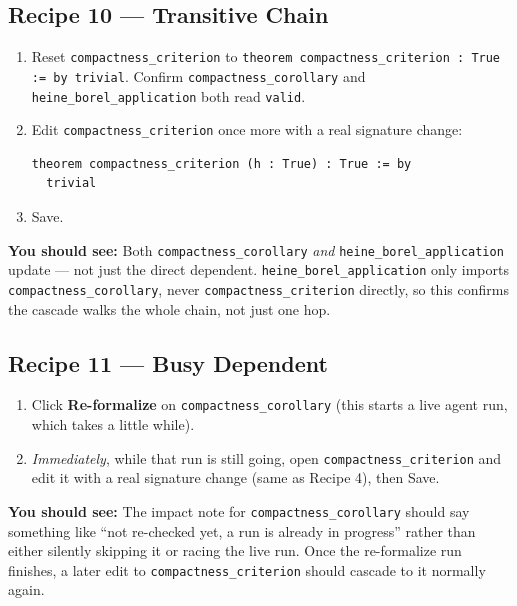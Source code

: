 \documentclass[11pt]{article}
\newcommand{\code}[1]{\texttt{#1}}
\newcommand{\see}[1]{\textbf{You should see:} #1}
\begin{document}
\subsection*{Recipe 10 --- Transitive Chain}
\begin{enumerate}[label=\arabic*.]
  \item Reset \code{compactness\_criterion} to
    \code{theorem compactness\_criterion : True := by trivial}. Confirm
    \code{compactness\_corollary} and \code{heine\_borel\_application} both
    read \code{valid}.
  \item Edit \code{compactness\_criterion} once more with a real signature
    change:
\begin{verbatim}
theorem compactness_criterion (h : True) : True := by
  trivial
\end{verbatim}
  \item Save.
\end{enumerate}
\see{Both \code{compactness\_corollary} \emph{and}
\code{heine\_borel\_application} update --- not just the direct dependent.
\code{heine\_borel\_application} only imports \code{compactness\_corollary},
never \code{compactness\_criterion} directly, so this confirms the cascade
walks the whole chain, not just one hop.}

\subsection*{Recipe 11 --- Busy Dependent}
\begin{enumerate}[label=\arabic*.]
  \item Click \textbf{Re-formalize} on \code{compactness\_corollary} (this
    starts a live agent run, which takes a little while).
  \item \emph{Immediately}, while that run is still going, open
    \code{compactness\_criterion} and edit it with a real signature change
    (same as Recipe 4), then Save.
\end{enumerate}
\see{The impact note for \code{compactness\_corollary} should say something
like ``not re-checked yet, a run is already in progress'' rather than either
silently skipping it or racing the live run. Once the re-formalize run
finishes, a later edit to \code{compactness\_criterion} should cascade to it
normally again.}
\end{document}
